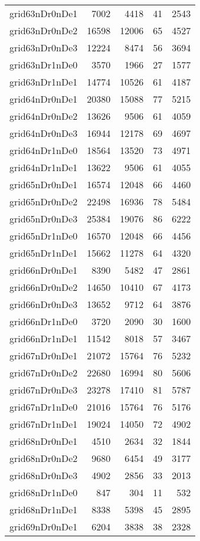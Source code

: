 \begin{longtable}{lrrrr}
grid63nDr0nDe1 & 7002 & 4418 & 41 & 2543 \\
grid63nDr0nDe2 & 16598 & 12006 & 65 & 4527 \\
grid63nDr0nDe3 & 12224 & 8474 & 56 & 3694 \\
grid63nDr1nDe0 & 3570 & 1966 & 27 & 1577 \\
grid63nDr1nDe1 & 14774 & 10526 & 61 & 4187 \\
grid64nDr0nDe1 & 20380 & 15088 & 77 & 5215 \\
grid64nDr0nDe2 & 13626 & 9506 & 61 & 4059 \\
grid64nDr0nDe3 & 16944 & 12178 & 69 & 4697 \\
grid64nDr1nDe0 & 18564 & 13520 & 73 & 4971 \\
grid64nDr1nDe1 & 13622 & 9506 & 61 & 4055 \\
grid65nDr0nDe1 & 16574 & 12048 & 66 & 4460 \\
grid65nDr0nDe2 & 22498 & 16936 & 78 & 5484 \\
grid65nDr0nDe3 & 25384 & 19076 & 86 & 6222 \\
grid65nDr1nDe0 & 16570 & 12048 & 66 & 4456 \\
grid65nDr1nDe1 & 15662 & 11278 & 64 & 4320 \\
grid66nDr0nDe1 & 8390 & 5482 & 47 & 2861 \\
grid66nDr0nDe2 & 14650 & 10410 & 67 & 4173 \\
grid66nDr0nDe3 & 13652 & 9712 & 64 & 3876 \\
grid66nDr1nDe0 & 3720 & 2090 & 30 & 1600 \\
grid66nDr1nDe1 & 11542 & 8018 & 57 & 3467 \\
grid67nDr0nDe1 & 21072 & 15764 & 76 & 5232 \\
grid67nDr0nDe2 & 22680 & 16994 & 80 & 5606 \\
grid67nDr0nDe3 & 23278 & 17410 & 81 & 5787 \\
grid67nDr1nDe0 & 21016 & 15764 & 76 & 5176 \\
grid67nDr1nDe1 & 19024 & 14050 & 72 & 4902 \\
grid68nDr0nDe1 & 4510 & 2634 & 32 & 1844 \\
grid68nDr0nDe2 & 9680 & 6454 & 49 & 3177 \\
grid68nDr0nDe3 & 4902 & 2856 & 33 & 2013 \\
grid68nDr1nDe0 & 847 & 304 & 11 & 532 \\
grid68nDr1nDe1 & 8338 & 5398 & 45 & 2895 \\
grid69nDr0nDe1 & 6204 & 3838 & 38 & 2328 \\

\end{longtable}
